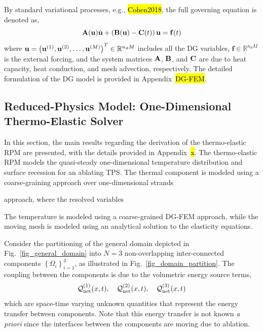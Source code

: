 By standard variational processes, e.g., \hl{Cohen2018}, the full governing equation is denoted as,
\begin{equation}
    \mathbf{A}(\mathbf{u})\dot{\mathbf{u}} + \left(\mathbf{B}(\mathbf{u}) - \mathbf{C}(t)\right)\mathbf{u} = \mathbf{f}(t)\label{eqn_fom}
\end{equation}
where $\mathbf{u} = \left(\mathbf{u}^{(1)}, \mathbf{u}^{(2)}, \ldots, \mathbf{u}^{(M)}\right)^T\in\mathbb{R}^{n_dM}$ includes all the DG variables, $\mathbf{f}\in\mathbb{R}^{n_dM}$ is the external forcing, and the system matrices $\mathbf{A}$, $\mathbf{B}$, and $\mathbf{C}$ are due to heat capacity, heat conduction, and mesh advection, respectively. The detailed formulation of the DG model is provided in Appendix~\hl{DG-FEM}.

\subsection{Reduced-Physics Model: One-Dimensional Thermo-Elastic Solver}

In this section, the main results regarding the derivation of the thermo-elastic RPM are presented, with the details provided in Appendix~\hl{x}. The thermo-elastic RPM models the quasi-steady one-dimensional temperature distribution and surface recession for an ablating TPS. The thermal component is modeled using a coarse-graining approach over one-dimensional strands


approach, where the resolved variables 

The temperature is modeled using a coarse-grained DG-FEM approach, while the moving mesh is modeled using an analytical solution to the elasticity equations.

Consider the partitioning of the general domain depicted in Fig.~\ref{fig_general_domain} into $N=3$ non-overlapping inter-connected components $\left\{\Omega_i\right\}_{i=1}^{3}$, as illustrated in Fig.~\ref{fig_domain_partition}. The coupling between the components is due to the volumetric energy source terms,
\[
    \mathcal{Q}_{\text{net}}^{(1)}(x,t),\quad\mathcal{Q}_{\text{net}}^{(2)}(x,t),\quad \mathcal{Q}_{\text{net}}^{(3)}(x,t)
\]
which are space-time varying unknown quantities that represent the energy transfer between components. Note that this energy transfer is not known \emph{a priori} since the interfaces between the components are moving due to ablation. 


